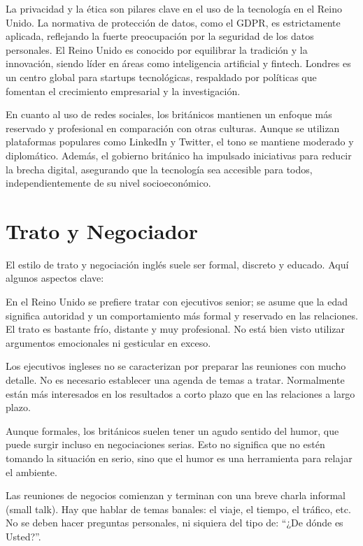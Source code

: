 \documentclass[letterpaper, 12pt]{article}
\begin{document}
La privacidad y la ética son pilares clave en el uso de la tecnología en el
Reino Unido. La normativa de protección de datos, como el GDPR, es
estrictamente aplicada, reflejando la fuerte preocupación por la seguridad de
los datos personales. El Reino Unido es conocido por equilibrar la tradición y
la innovación, siendo líder en áreas como inteligencia artificial y fintech.
Londres es un centro global para startups tecnológicas, respaldado por
políticas que fomentan el crecimiento empresarial y la investigación.

En cuanto al uso de redes sociales, los británicos mantienen un enfoque más
reservado y profesional en comparación con otras culturas. Aunque se utilizan
plataformas populares como LinkedIn y Twitter, el tono se mantiene moderado y
diplomático. Además, el gobierno británico ha impulsado iniciativas para
reducir la brecha digital, asegurando que la tecnología sea accesible para
todos, independientemente de su nivel socioeconómico.

\section*{Trato y Negociador}

El estilo de trato y negociación inglés suele ser formal, discreto y educado.
Aquí algunos aspectos clave:

En el Reino Unido se prefiere tratar con ejecutivos senior; se asume que la
edad significa autoridad y un comportamiento más formal y reservado en las
relaciones. El trato es bastante frío, distante y muy profesional. No está bien
visto utilizar argumentos emocionales ni gesticular en exceso.

Los ejecutivos ingleses no se caracterizan por preparar las reuniones con mucho
detalle. No es necesario establecer una agenda de temas a tratar. Normalmente
están más interesados en los resultados a corto plazo que en las relaciones a
largo plazo.

Aunque formales, los británicos suelen tener un agudo sentido del humor, que
puede surgir incluso en negociaciones serias. Esto no significa que no estén
tomando la situación en serio, sino que el humor es una herramienta para
relajar el ambiente.

Las reuniones de negocios comienzan y terminan con una breve charla informal
(small talk). Hay que hablar de temas banales: el viaje, el tiempo, el tráfico,
etc. No se deben hacer preguntas personales, ni siquiera del tipo de: “¿De
dónde es Usted?”.
\end{document}
